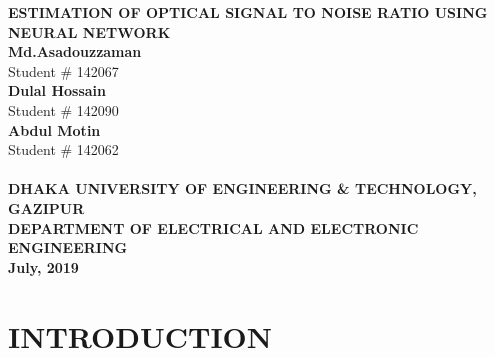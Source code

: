 \documentclass[12pt]{report}
\begin{document}
	\begin{titlepage}
		\begin{center}
			\LARGE {\bfseries {ESTIMATION OF OPTICAL SIGNAL TO NOISE RATIO USING NEURAL NETWORK}}\\[1.5cm]
			{\normalsize 
			\textbf{Md.Asadouzzaman}\\
			Student \# 142067\\
			\textbf{Dulal Hossain}\\
			Student \# 142090\\
			\textbf{Abdul Motin}\\
			Student \# 142062\\[4cm]}
			\\[3cm]
			{\fontsize{14}{0} \bfseries {DHAKA UNIVERSITY OF ENGINEERING \& TECHNOLOGY, GAZIPUR}}\\
			{\fontsize{12}{0} \bfseries {DEPARTMENT OF ELECTRICAL AND ELECTRONIC ENGINEERING}}\\
			{\fontsize{12}{0} \textbf{July, 2019}}
		\end{center}
	\end{titlepage}
	
	\tableofcontents
	\listoffigures
	
	
	
	
	\chapter{INTRODUCTION}
\end{document}
